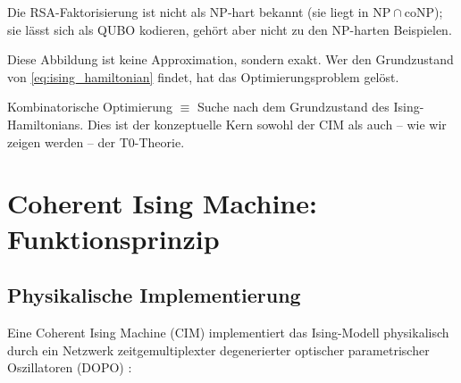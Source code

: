 \begin{table}[h]
    \centering
    \caption{Beispiele für die Abbildung von Optimierungsproblemen (überwiegend NP-hart) auf Ising-Hamiltonians}
    \label{tab:qubo_examples}
\end{table}
Die RSA-Faktorisierung ist nicht als NP-hart bekannt (sie liegt in $\mathrm{NP} \cap \mathrm{coNP}$); sie lässt sich als QUBO kodieren, gehört aber nicht zu den NP-harten Beispielen.

Diese Abbildung ist keine Approximation, sondern exakt. Wer den Grundzustand von 
\eqref{eq:ising_hamiltonian} findet, hat das Optimierungsproblem gelöst.

\begin{important}
    Kombinatorische Optimierung $\equiv$ Suche nach dem Grundzustand des Ising-Hamiltonians. 
    Dies ist der konzeptuelle Kern sowohl der CIM als auch -- wie wir zeigen werden -- 
    der T0-Theorie.
\end{important}

\clearpage

\section{Coherent Ising Machine: Funktionsprinzip}
\label{sec:cim}

\subsection{Physikalische Implementierung}

Eine Coherent Ising Machine (CIM) implementiert das Ising-Modell physikalisch durch 
ein Netzwerk zeitgemultiplexter degenerierter optischer parametrischer Oszillatoren 
(DOPO) \cite{yamamoto_cim_2017, honjo_100k_cim_2021}:

